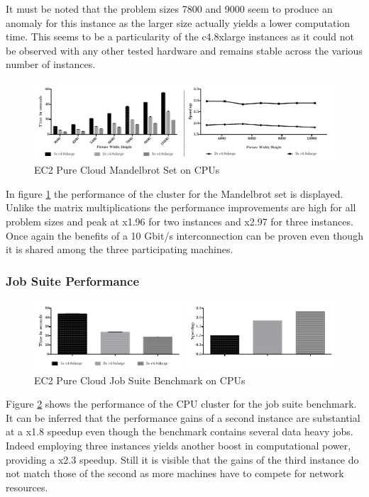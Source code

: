 It must be noted that the problem sizes 7800 and 9000 seem to produce an anomaly for this instance as the larger size actually yields a lower computation time. This seems to be a particularity of the c4.8xlarge instances as it could not be observed with any other tested hardware and remains stable across the various number of instances.

\begin{figure}[H]	
	\includegraphics[width=1.0\textwidth]{images/ec2_cpu_mandelbrot.pdf}
	\centering
	\caption{EC2 Pure Cloud Mandelbrot Set on CPUs}
	\label{img:ec2_cpu_mandelbrot}
\end{figure}

In figure \ref{img:ec2_cpu_mandelbrot} the performance of the cluster for the Mandelbrot set is displayed. Unlike the matrix multiplications the performance improvements are high for all problem sizes and peak at x1.96 for two instances and x2.97 for three instances. Once again the benefits of a 10 Gbit/s interconnection can be proven even though it is shared among the three participating machines. 
\subsubsection*{Job Suite Performance}

\begin{figure}[H]	
	\includegraphics[width=1.0\textwidth]{images/ec2_cpu_full_benchmark.pdf}
	\centering
	\caption{EC2 Pure Cloud Job Suite Benchmark on CPUs}
	\label{img:ec2_cpu_full_benchmark}
\end{figure}

Figure \ref{img:ec2_cpu_full_benchmark} shows the performance of the CPU cluster for the job suite benchmark. It can be inferred that the performance gains of a second instance are substantial at a x1.8 speedup even though the benchmark contains several data heavy jobs. Indeed employing three instances yields another boost in computational power, providing a x2.3 speedup. Still it is visible that the gains of the third instance do not match those of the second as more machines have to compete for network resources.

